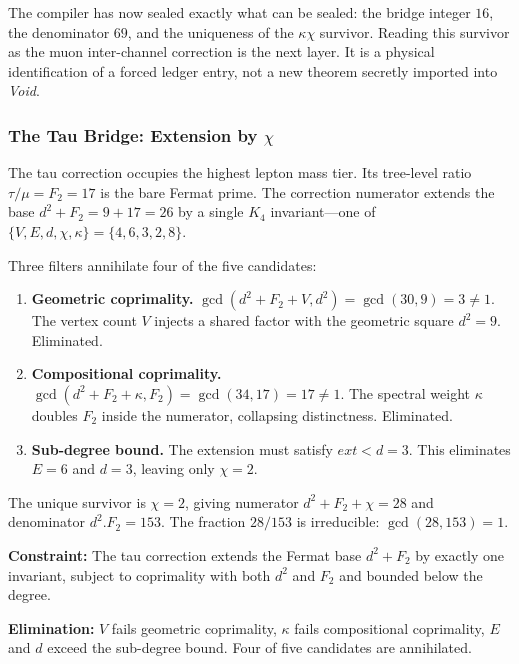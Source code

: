 \documentclass[11pt,a4paper]{book}
\def\cdot{.}%
\def\mathrm#1{#1}%
\begin{document}
The compiler has now sealed exactly what can be sealed: the bridge
integer $16$, the denominator $69$, and the uniqueness of the
$\kappa\chi$ survivor.  Reading this survivor as the muon inter-channel
correction is the next layer.  It is a physical identification of a
forced ledger entry, not a new theorem secretly imported into
\textit{Void}.

\subsubsection*{The Tau Bridge: Extension by $\chi$}

The tau correction occupies the highest lepton mass tier.  Its
tree-level ratio $\tau/\mu = F_2 = 17$ is the bare Fermat prime.
The correction numerator extends the base $d^2 + F_2 = 9 + 17 = 26$
by a single $K_4$ invariant---one of
$\{V, E, d, \chi, \kappa\} = \{4, 6, 3, 2, 8\}$.

Three filters annihilate four of the five candidates:

\begin{enumerate}
\item \textbf{Geometric coprimality.}
      $\gcd(d^2 + F_2 + V, d^2) = \gcd(30, 9) = 3 \neq 1$.
      The vertex count $V$ injects a shared factor with the geometric
      square $d^2 = 9$.  Eliminated.

\item \textbf{Compositional coprimality.}
      $\gcd(d^2 + F_2 + \kappa, F_2) = \gcd(34, 17) = 17 \neq 1$.
      The spectral weight $\kappa$ doubles $F_2$ inside the numerator,
      collapsing distinctness.  Eliminated.

\item \textbf{Sub-degree bound.}
      The extension must satisfy $\mathrm{ext} < d = 3$.
      This eliminates $E = 6$ and $d = 3$, leaving only $\chi = 2$.
\end{enumerate}

The unique survivor is $\chi = 2$, giving numerator
$d^2 + F_2 + \chi = 28$ and denominator $d^2 \cdot F_2 = 153$.
The fraction $28/153$ is irreducible: $\gcd(28, 153) = 1$.

\textbf{Constraint:}
The tau correction extends the Fermat base $d^2 + F_2$ by exactly
one invariant, subject to coprimality with both $d^2$ and $F_2$
and bounded below the degree.

\textbf{Elimination:}
$V$ fails geometric coprimality, $\kappa$ fails compositional
coprimality, $E$ and $d$ exceed the sub-degree bound.  Four of
five candidates are annihilated.
\end{document}
